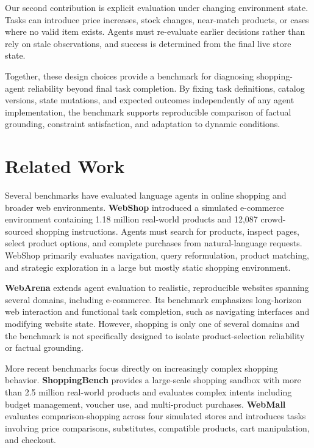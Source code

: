\documentclass{article} %
\begin{document}
Our second contribution is explicit evaluation under changing environment state. Tasks can introduce price increases, stock changes, near-match products, or cases where no valid item exists. Agents must re-evaluate earlier decisions rather than rely on stale observations, and success is determined from the final live store state.

Together, these design choices provide a benchmark for diagnosing shopping-agent reliability beyond final task completion. By fixing task definitions, catalog versions, state mutations, and expected outcomes independently of any agent implementation, the benchmark supports reproducible comparison of factual grounding, constraint satisfaction, and adaptation to dynamic conditions.

\section{Related Work}
\label{sec:related_work}

Several benchmarks have evaluated language agents in online shopping and broader web environments. \textbf{WebShop} \cite{yao2022webshop} introduced a simulated e-commerce environment containing 1.18 million real-world products and 12,087 crowd-sourced shopping instructions. Agents must search for products, inspect pages, select product options, and complete purchases from natural-language requests. WebShop primarily evaluates navigation, query reformulation, product matching, and strategic exploration in a large but mostly static shopping environment.

\textbf{WebArena} \cite{zhou2024webarena} extends agent evaluation to realistic, reproducible websites spanning several domains, including e-commerce. Its benchmark emphasizes long-horizon web interaction and functional task completion, such as navigating interfaces and modifying website state. However, shopping is only one of several domains and the benchmark is not specifically designed to isolate product-selection reliability or factual grounding.

More recent benchmarks focus directly on increasingly complex shopping behavior. \textbf{ShoppingBench} \cite{wang2026shoppingbench} provides a large-scale shopping sandbox with more than 2.5 million real-world products and evaluates complex intents including budget management, voucher use, and multi-product purchases. \textbf{WebMall} \cite{peeters2026webmall} evaluates comparison-shopping across four simulated stores and introduces tasks involving price comparisons, substitutes, compatible products, cart manipulation, and checkout.
\end{document}

